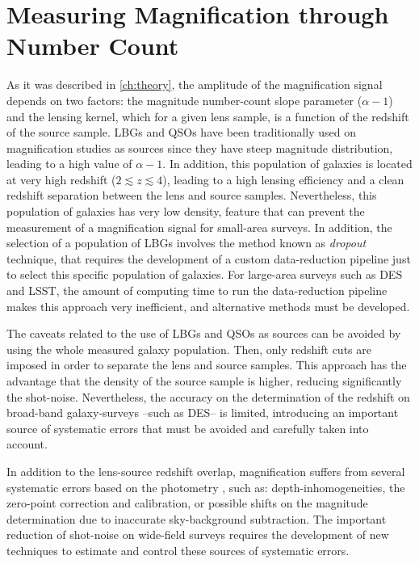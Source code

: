 \section{Measuring Magnification through Number Count}
\label{sec:method}
As it was described in \autoref{ch:theory}, the amplitude of the magnification signal depends on two factors: the magnitude number-count slope parameter ($\alpha-1$) and the lensing kernel, which for a given lens sample, is a function of the redshift of the source sample. LBGs and QSOs have been traditionally used on magnification studies as sources since they have steep magnitude distribution, leading to a high value of $\alpha-1$. In addition, this population of galaxies is located at very high redshift ($2\lesssim z\lesssim 4$), leading to a high lensing efficiency and a clean redshift separation between the lens and source samples. Nevertheless, this population of galaxies has very low density, feature that can prevent the measurement of a magnification signal for small-area surveys. In addition, the selection of a population of LBGs involves the method known as {\it dropout} technique, that requires the development of a custom data-reduction pipeline just to select this specific population of galaxies. For large-area surveys such as DES and LSST, the amount of computing time to run the data-reduction pipeline makes this approach very inefficient, and alternative methods must be developed.
\newline

The caveats related to the use of LBGs and QSOs as sources can be avoided by using the whole measured galaxy population. Then, only redshift cuts are imposed in order to separate the lens and source samples. This approach has the advantage that the density of the source sample is higher, reducing significantly the shot-noise. Nevertheless, the accuracy on the determination of the redshift on broad-band galaxy-surveys --such as DES-- is limited, introducing an important source of systematic errors that must be avoided and carefully taken into account.
\newline

In addition to the lens-source redshift overlap, magnification suffers from several systematic errors based on the photometry \cite{2015MNRAS.454.3121M,2016MNRAS.455.3943H}, such as: depth-inhomogeneities, the zero-point correction and calibration, or possible shifts on the magnitude determination due to inaccurate sky-background subtraction. The important reduction of shot-noise on wide-field surveys requires the development of new techniques to estimate and control these sources of systematic errors.
\newline

